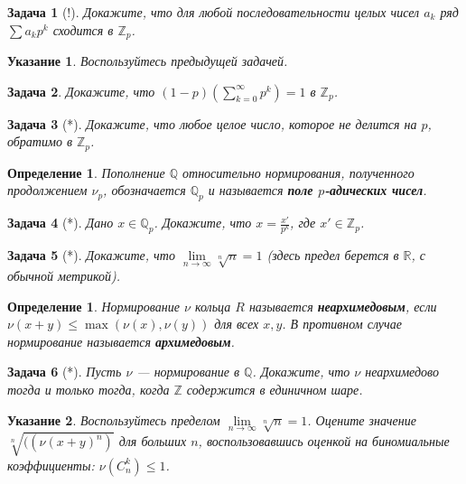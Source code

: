 \documentclass[12pt]{book}
\def\Z{{\mathbb Z}}
\def\R{{\mathbb R}}
\def\Q{{\mathbb Q}}
\theoremstyle{upshape}
\newtheorem{zadacha}{Задача}[chapter]
\theoremstyle{generic}
\newtheorem{opredelenie}[teorema]{Определение}
\theoremstyle{upshapenonumber}
\newtheorem{ukazanie}{Указание}[section]
\newcommand{\следствие}{%
     \refstepcounter{teorema}
     {\noindent\bf Следствие \thechapter.\arabic{teorema}:\ }}
\newcommand{\пример}{%
     \refstepcounter{teorema}
     {\noindent\bf Пример \thechapter.\arabic{teorema}:\ }}
\newcommand{\лемма}{%
     \refstepcounter{teorema}
     {\noindent\bf Лемма \thechapter.\arabic{teorema}:\ }}
\newcommand{\теорема}{%
     \refstepcounter{teorema}
     {\noindent\bf Теорема \thechapter.\arabic{teorema}:\ }}
\newcommand{\утверждение}{%
     \refstepcounter{teorema}
     {\noindent\bf Утверждение \thechapter.\arabic{teorema}:\ }}
\begin{document}
{\begin{zadacha}[!] Докажите, что для любой последовательности целых
чисел $a_k$ ряд $\sum a_k p^k$ сходится в $\Z_p$.
\end{zadacha}

\begin{ukazanie} Воспользуйтесь предыдущей задачей.
\end{ukazanie}

\begin{zadacha} Докажите, что $(1-p) (\sum_{k=0}^\infty  p^k) =1$
в $\Z_p$.
\end{zadacha}

\begin{zadacha}[*] Докажите, что любое целое число, которое
не делится на $p$, обратимо в $\Z_p$.
\end{zadacha}

\begin{opredelenie} Пополнение $\Q$ относительно нормирования, полученного
продолжением $\nu_p$, обозначается $\Q_p$ и называется {\bf поле
$p$-адических чисел}.
\end{opredelenie}

\begin{zadacha}[*] Дано $x\in \Q_p$. Докажите, что
$x = \frac {x'}{p^k}$, где $x'\in \Z_p$.
\end{zadacha}

\begin{zadacha}[*]
Докажите, что $\lim\limits_{n\to \infty} \sqrt[n]{n}=1$
(здесь предел берется в $\R$, с обычной метрикой).
\end{zadacha}

\begin{opredelenie} Нормирование $\nu$ кольца $R$ называется
{\bf неархимедовым}, если $\nu (x+y) \leq \max (\nu(x), \nu(y))$
для всех $x,y$. В
противном случае нормирование называется {\bf архимедовым}.
\end{opredelenie}

\begin{zadacha}[*] Пусть $\nu$ --- нормирование в $\Q$.
Докажите, что $\nu$ неархимедово тогда и только тогда,
когда $\Z$ содержится в единичном шаре. 
\end{zadacha}

\begin{ukazanie} Воспользуйтесь пределом 
$\lim\limits_{n\to \infty} \sqrt[n]{n}=1$.
Оцените значение $\sqrt[n]{((\nu(x+y)^n)}$ для
больших $n$, воспользовавшись оценкой на
биномиальные коэффициенты: $\nu(C^k_n)\leq 1$.
\end{ukazanie}

}
\end{document}
